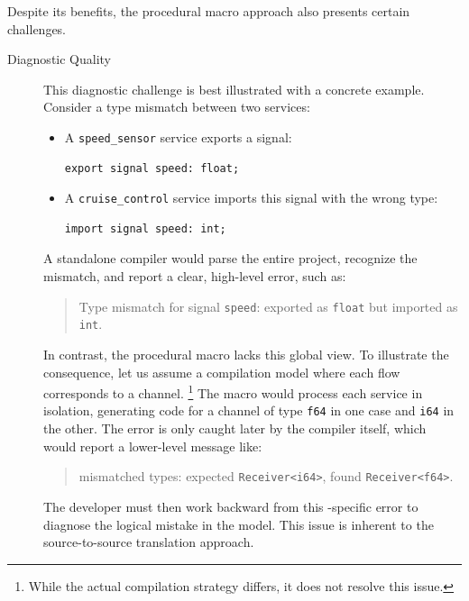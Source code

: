 Despite its benefits, the procedural macro approach also presents certain challenges.
\begin{description}
    \item[Diagnostic Quality] This diagnostic challenge is best illustrated with a concrete example.
          Consider a type mismatch between two services:
          \begin{itemize}
              \item A \texttt{speed\_sensor} service exports a signal:
                    \begin{lstlisting}[language=GRust,numbers=none,basicstyle=\ttfamily\color{BlackText}]
export signal speed: float;
\end{lstlisting}
              \item A \texttt{cruise\_control} service imports this signal with the wrong type:
                    \begin{lstlisting}[language=GRust,numbers=none,basicstyle=\ttfamily\color{BlackText}]
import signal speed: int;
\end{lstlisting}
          \end{itemize}
          A standalone compiler would parse the entire project, recognize the mismatch, and report
          a clear, high-level error, such as:
          \begin{quote}
              Type mismatch for signal \texttt{speed}: exported as \texttt{float} but imported as
              \texttt{int}.
          \end{quote}
          In contrast, the procedural macro lacks this global view. To illustrate the consequence,
          let us assume a compilation model where each flow corresponds to a \Rust channel.%
          \footnote{While the actual compilation strategy differs, it does not resolve this issue.}
          The macro would process each service in isolation, generating code for a channel of type
          \texttt{f64} in one case and \texttt{i64} in the other. The error is only caught later by
          the \Rust compiler itself, which would report a lower-level message like:
          \begin{quote}
              mismatched types: expected \texttt{Receiver<i64>}, found \texttt{Receiver<f64>}.
          \end{quote}
          The developer must then work backward from this \Rust-specific error to diagnose the
          logical mistake in the \GRust model. This issue is inherent to the source-to-source
          translation approach.


\end{description}
